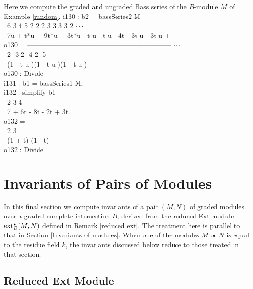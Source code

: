 \begin{sExample}
Here we compute the graded and ungraded Bass series of the $B$-module
$M$ of Example \ref{random}.
\beginOutput
i130 : b2 = bassSeries2 M\\
\emptyLine
\         6      3       4       5    2 2    2 3     3     3      3 2   $\cdot\cdot\cdot$\\
\       7u  + t*u  + 9t*u  + 3t*u  - t u  - t u  - 4t  - 3t u - 3t u  + $\cdot\cdot\cdot$\\
o130 = --------------------------------------------------------------- $\cdot\cdot\cdot$\\
\                                    2 -3       2 -4       2 -5\\
\                              (1 - t u  )(1 - t u  )(1 - t u  )\\
\emptyLine
o130 : Divide\\
\endOutput
\beginOutput
i131 : b1 = bassSeries1 M;\\
\endOutput
\beginOutput
i132 : simplify b1\\
\emptyLine
\                  2     3     4\\
\       7 + 6t - 8t  - 2t  + 3t\\
o132 = ------------------------\\
\                  2       3\\
\           (1 + t) (1 - t)\\
\emptyLine
o132 : Divide\\
\endOutput
 \end{sExample}

\section{Invariants of Pairs of Modules}
\label{Invariants of pairs of modules}

In this final section we compute invariants of a pair $(M,N)$ of graded
modules over a graded complete intersection $B$, derived from the
reduced Ext module $\operatorname{ext}^{\scriptscriptstyle\bullet}_B(M,N)$ defined in Remark \ref{reduced
ext}.  The treatment here is parallel to that in Section
\ref{Invariants of modules}.  When one of the modules $M$ or $N$ is
equal to the residue field $k$, the invariants discussed below reduce
to those treated in that section.

\subsection{Reduced Ext Module}

